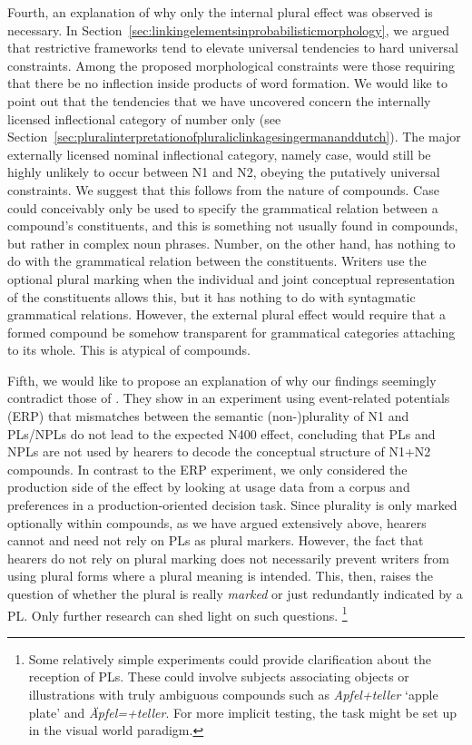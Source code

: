 Fourth, an explanation of why only the internal plural effect was observed is necessary.
In Section~\ref{sec:linkingelementsinprobabilisticmorphology}, we argued that restrictive frameworks tend to elevate universal tendencies to hard universal constraints.
Among the proposed morphological constraints were those requiring that there be no inflection inside products of word formation.
We would like to point out that the tendencies that we have uncovered concern the internally licensed inflectional category of number only (see Section~\ref{sec:pluralinterpretationofpluraliclinkagesingermananddutch}).
The major externally licensed nominal inflectional category, namely case, would still be highly unlikely to occur between N1 and N2, obeying the putatively universal constraints.
We suggest that this follows from the nature of compounds.
Case could conceivably only be used to specify the grammatical relation between a compound's constituents, and this is something not usually found in compounds, but rather in complex noun phrases.
Number, on the other hand, has nothing to do with the grammatical relation between the constituents.
Writers use the optional plural marking when the individual and joint conceptual representation of the constituents allows this, but it has nothing to do with syntagmatic grammatical relations.
However, the external plural effect would require that a formed compound be somehow transparent for grammatical categories attaching to its whole.
This is atypical of compounds.

Fifth, we would like to propose an explanation of why our findings seemingly contradict those of \textcite{KoesterEa2004}.
They show in an experiment using event-related potentials (ERP) that mismatches between the semantic (non-)plurality of N1 and PLs\slash NPLs do not lead to the expected N400 effect, concluding that PLs and NPLs are not used by hearers to decode the conceptual structure of N1+N2 compounds.
In contrast to the ERP experiment, we only considered the production side of the effect by looking at usage data from a corpus and preferences in a production-oriented decision task.
Since plurality is only marked optionally within compounds, as we have argued extensively above, hearers cannot and need not rely on PLs as plural markers.
However, the fact that hearers do not rely on plural marking does not necessarily prevent writers from using plural forms where a plural meaning is intended.
This, then, raises the question of whether the plural is really \textit{marked} or just redundantly indicated by a PL.
Only further research can shed light on such questions.%
\footnote{Some relatively simple experiments could provide clarification about the reception of PLs.
These could involve subjects associating objects or illustrations with truly ambiguous compounds such as \textit{Apfel+teller} `apple plate' and \textit{Äpfel=+teller}.
For more implicit testing, the task might be set up in the visual world paradigm.}

